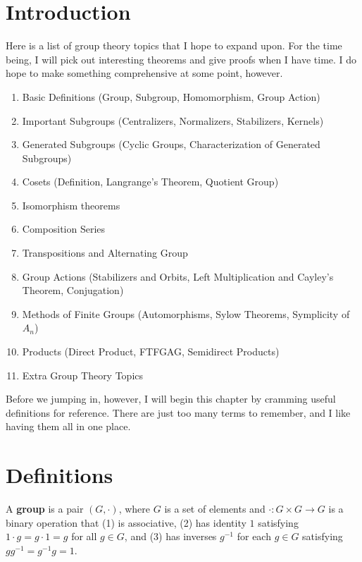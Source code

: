 \documentclass[class=report, crop=false]{standalone}
\begin{document}
\section{Introduction}

Here is a list of group theory topics that I hope to expand upon. For the time being, I will pick out interesting theorems and give proofs when I have time. I do hope to make something comprehensive at some point, however.
\begin{enumerate}
    \item Basic Definitions (Group, Subgroup, Homomorphism, Group Action)
    \item Important Subgroups (Centralizers, Normalizers, Stabilizers, Kernels)
    \item Generated Subgroups (Cyclic Groups, Characterization of Generated Subgroups)
    \item Cosets (Definition, Langrange's Theorem, Quotient Group)
    \item Isomorphism theorems
    \item Composition Series
    \item Transpositions and Alternating Group
    \item Group Actions (Stabilizers and Orbits, Left Multiplication and Cayley's Theorem, Conjugation)
    \item Methods of Finite Groups (Automorphisms, Sylow Theorems, Symplicity of $A_n$)
    \item Products (Direct Product, FTFGAG, Semidirect Products)
    \item Extra Group Theory Topics
\end{enumerate}

Before we jumping in, however, I will begin this chapter by cramming useful definitions for reference. There are just too many terms to remember, and I like having them all in one place.


\newpage

\section{Definitions}


\begin{boxedenv}\begin{definition}
    A \textbf{group} is a pair $(G,\cdot)$, where $G$ is a set of elements and $\cdot: G\times G\to G$ is a binary operation that (1) is associative, (2) has identity $1$ satisfying $1\cdot g = g\cdot 1 = g$ for all $g\in G$, and (3) has inverses $g^{-1}$ for each $g\in G$ satisfying $gg^{-1}=g^{-1}g=1$.
\end{definition}\end{boxedenv}
\end{document}
